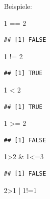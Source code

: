 \documentclass[
]{book}
\newenvironment{Shaded}{\begin{snugshade}}{\end{snugshade}}
\newcommand{\DecValTok}[1]{\textcolor[rgb]{0.00,0.00,0.81}{#1}}
\newcommand{\SpecialCharTok}[1]{\textcolor[rgb]{0.00,0.00,0.00}{#1}}
\begin{document}
Beispiele:

\begin{Shaded}
\begin{Highlighting}[]
\DecValTok{1} \SpecialCharTok{==} \DecValTok{2}
\end{Highlighting}
\end{Shaded}

\begin{verbatim}
## [1] FALSE
\end{verbatim}

\begin{Shaded}
\begin{Highlighting}[]
\DecValTok{1} \SpecialCharTok{!=} \DecValTok{2}
\end{Highlighting}
\end{Shaded}

\begin{verbatim}
## [1] TRUE
\end{verbatim}

\begin{Shaded}
\begin{Highlighting}[]
\DecValTok{1} \SpecialCharTok{\textless{}} \DecValTok{2}
\end{Highlighting}
\end{Shaded}

\begin{verbatim}
## [1] TRUE
\end{verbatim}

\begin{Shaded}
\begin{Highlighting}[]
\DecValTok{1} \SpecialCharTok{\textgreater{}=} \DecValTok{2}
\end{Highlighting}
\end{Shaded}

\begin{verbatim}
## [1] FALSE
\end{verbatim}

\begin{Shaded}
\begin{Highlighting}[]
\DecValTok{1}\SpecialCharTok{\textgreater{}}\DecValTok{2} \SpecialCharTok{\&} \DecValTok{1}\SpecialCharTok{\textless{}=}\DecValTok{3}
\end{Highlighting}
\end{Shaded}

\begin{verbatim}
## [1] FALSE
\end{verbatim}

\begin{Shaded}
\begin{Highlighting}[]
\DecValTok{2}\SpecialCharTok{\textgreater{}}\DecValTok{1} \SpecialCharTok{|} \DecValTok{1}\SpecialCharTok{!=}\DecValTok{1}
\end{Highlighting}
\end{Shaded}
\end{document}
